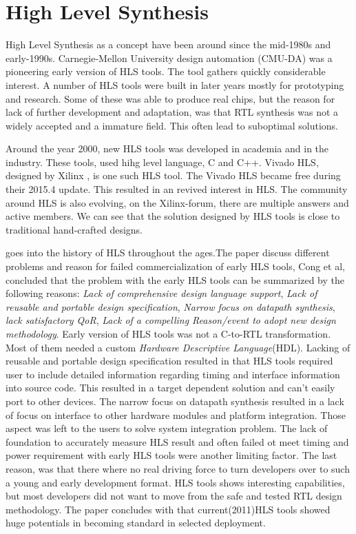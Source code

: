 \section{High Level Synthesis}
High Level Synthesis as a concept have been around since the mid-1980s and early-1990s\cite{HLSTutorial}\citep{HLSPastFutur}. Carnegie-Mellon University design automation (CMU-DA)\citep{1085036}\citep{Parker:1979:CDA:800292.811694} was a pioneering early version of HLS tools. The tool gathers quickly considerable interest. A number of HLS tools were built in later years mostly for prototyping and research\cite{Granacki:1985:AAD:317825.317970}\citep{Paulin:1986:HMA:318013.318055}\citep{4069894}. Some of these was able to produce real chips, but the reason for lack of further development and adaptation, was that RTL synthesis was not a widely accepted and a immature field. This often lead to suboptimal solutions. 

Around the year 2000, new HLS tools was developed in academia and in the industry. These tools, used hihg level language, C and C++. Vivado HLS, designed by Xilinx \citep{6409453}, is one such HLS tool. The Vivado HLS became free during their 2015.4 update\citep{VIVADOHLS}. This resulted in an revived interest in HLS. The community around HLS is also evolving, on the Xilinx-forum, there are multiple answers and active members. We can see that the solution designed by HLS tools is close to traditional hand-crafted designs\citep{6718388}.

\cite{HLSTutorial} goes into the history of HLS throughout the ages.The paper discuss different problems and reason for failed commercialization of early HLS tools, Cong et al, concluded that the problem with the early HLS tools can be summarized by the following reasons: \textit{Lack of comprehensive design language support}, \textit{Lack of reusable and portable design specification}, \textit{Narrow focus on datapath synthesis}, \textit{lack satisfactory QoR}, \textit{Lack of a compelling Reason/event to adopt new design methodology}.
 Early version of HLS tools was not a C-to-RTL transformation. Most of them needed a custom \textit{Hardware Descriptive Language}(HDL). Lacking of reusable and portable design specification resulted in that HLS tools required user to include detailed information regarding timing and interface information into source code. This resulted in a target dependent solution and can't easily port to other devices. The narrow focus on datapath synthesis resulted in a lack of focus on interface to other hardware modules and platform integration. Those aspect was left to the users to solve system integration problem. The lack of foundation to accurately measure HLS result and often failed ot meet timing and power requirement with early HLS tools were another limiting factor. The last reason, was that there where no real driving force to turn developers over to such a young and early development format. HLS tools shows interesting capabilities, but most developers did not want to move from the safe and tested RTL design methodology. The paper concludes with that current(2011)HLS tools showed huge potentials in becoming standard in selected deployment.

